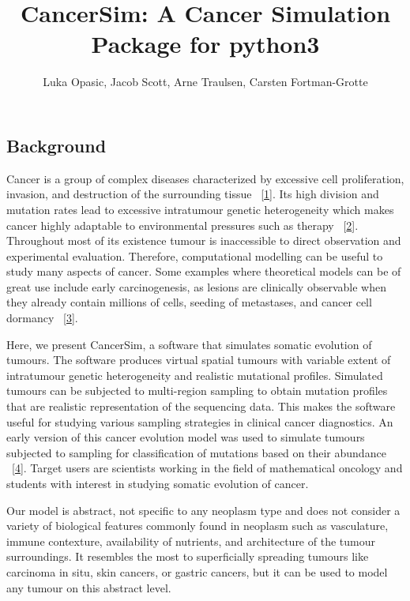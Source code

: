\documentclass[]{article}
\title{CancerSim: A Cancer Simulation Package for python3}
\author{Luka Opasic, Jacob Scott, Arne Traulsen, Carsten Fortman-Grotte}
\date{}
\begin{document}
\maketitle

\hypertarget{background}{%
\subsection{Background}\label{background}}

Cancer is a group of complex diseases characterized by excessive cell
proliferation, invasion, and destruction of the surrounding tissue
~{[}\protect\hyperlink{ref-kumar:book:2017}{1}{]}. Its high division and
mutation rates lead to excessive intratumour genetic heterogeneity which
makes cancer highly adaptable to environmental pressures such as therapy
~{[}\protect\hyperlink{ref-turajlic:NRG:2019}{2}{]}. Throughout most of
its existence tumour is inaccessible to direct observation and
experimental evaluation. Therefore, computational modelling can be
useful to study many aspects of cancer. Some examples where theoretical
models can be of great use include early carcinogenesis, as lesions are
clinically observable when they already contain millions of cells,
seeding of metastases, and cancer cell dormancy
~{[}\protect\hyperlink{ref-altrock:NatRevCancer:2015}{3}{]}.

Here, we present CancerSim, a software that simulates somatic evolution
of tumours. The software produces virtual spatial tumours with variable
extent of intratumour genetic heterogeneity and realistic mutational
profiles. Simulated tumours can be subjected to multi-region sampling to
obtain mutation profiles that are realistic representation of the
sequencing data. This makes the software useful for studying various
sampling strategies in clinical cancer diagnostics. An early version of
this cancer evolution model was used to simulate tumours subjected to
sampling for classification of mutations based on their abundance
~{[}\protect\hyperlink{ref-opasic:BMCCancer:2019}{4}{]}. Target users
are scientists working in the field of mathematical oncology and
students with interest in studying somatic evolution of cancer.

Our model is abstract, not specific to any neoplasm type and does not
consider a variety of biological features commonly found in neoplasm
such as vasculature, immune contexture, availability of nutrients, and
architecture of the tumour surroundings. It resembles the most to
superficially spreading tumours like carcinoma in situ, skin cancers, or
gastric cancers, but it can be used to model any tumour on this abstract
level.
\end{document}
